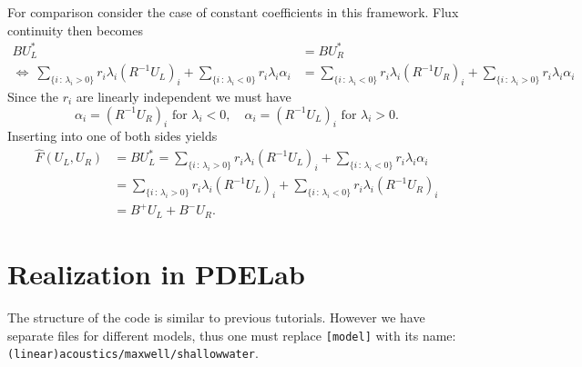 \documentclass[a4paper,12pt]{article}
\theoremstyle{definition}
\theoremstyle{definition}
\begin{document}
For comparison consider the case of constant coefficients in this framework.
Flux continuity then becomes
\begin{align*}
B U_L^\ast &= B U_R^\ast\\
\Leftrightarrow\ 
\sum_{\{i \,:\, \lambda_i> 0\}} r_i \lambda_i (R^{-1} U_L)_i + \sum_{\{i \,:\, \lambda_i<0\}} r_i \lambda_i \alpha_i
&= \sum_{\{i \,:\, \lambda_i< 0\}} r_i \lambda_i (R^{-1} U_R)_i + \sum_{\{i \,:\, \lambda_i>0\}} r_i \lambda_i \alpha_i 
\end{align*}
Since the $r_i$ are linearly independent we must have
\begin{equation*}
\alpha_i = (R^{-1} U_R)_i\text{ for $\lambda_i<0$}, \quad 
\alpha_i = (R^{-1} U_L)_i\text{ for $\lambda_i>0$}.
\end{equation*}
Inserting into one of both sides yields
\begin{equation*}
\begin{split}
\hat F(U_L,U_R) &= B U_L^\ast = \sum_{\{i \,:\, \lambda_i> 0\}} r_i \lambda_i (R^{-1} U_L)_i + \sum_{\{i \,:\, \lambda_i<0\}} r_i \lambda_i \alpha_i\\
&= \sum_{\{i \,:\, \lambda_i> 0\}} r_i \lambda_i (R^{-1} U_L)_i + \sum_{\{i \,:\, \lambda_i<0\}} r_i \lambda_i (R^{-1} U_R)_i\\
&= B^+U_L + B^- U_R .
\end{split}
\end{equation*}


\section{Realization in PDELab}

The structure of the code is similar to previous tutorials. However we have separate files for different models, thus one must replace \lstinline{[model]} with its name: \lstinline{(linear)acoustics/maxwell/shallowwater}. 
\end{document}
